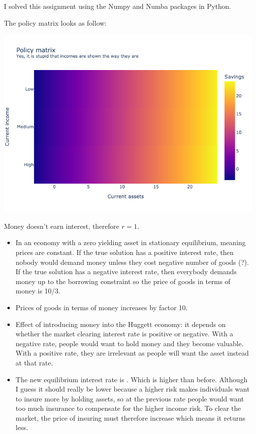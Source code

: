 \begin{questions}
\begin{solution}
I solved this assignment using the Numpy and Numba packages in Python.

The policy matrix looks as follow:

\includegraphics[scale=0.5]{figures/policy_matrix.png}


\end{solution}
Money doesn't earn interest, therefore $r = 1$.

\begin{solution}
	\begin{itemize}
		\item In an economy with a zero yielding asset in stationary equilibrium, meaning prices are constant. If the true solution has a positive interest rate, then nobody would demand money unless they cost negative number of goods (?). If the true solution has a negative interest rate, then everybody demands money up to the borrowing constraint so the price of goods in terms of money is 10/3.
		\item Prices of goods in terms of money increases by factor 10.
		\item Effect of introducing money into the Huggett economy: it depends on whether the market clearing interest rate is positive or negative. With a negative rate, people would want to hold money and they become valuable. With a positive rate, they are irrelevant as people will want the asset instead at that rate. 
		\item The new equilibrium interest rate is . Which is higher than before. Although I guess it should really be lower because a higher risk makes individuals want to insure more by holding assets, so at the previous rate people would want too much insurance to compensate for the higher income risk. To clear the market, the price of insuring must therefore increase which means it returns less.
	\end{itemize}
\end{solution}


\end{questions}




